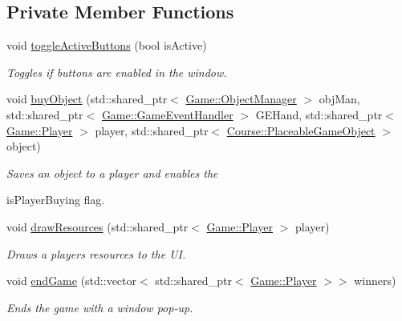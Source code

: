 \subsection*{Private Member Functions}
\begin{DoxyCompactItemize}
\item 
void \hyperlink{classMapWindow_af6b808b08a8a0b4a40ba2219550090da}{toggle\-Active\-Buttons} (bool is\-Active)
\begin{DoxyCompactList}\small\item\em Toggles if buttons are enabled in the window. \end{DoxyCompactList}\item 
void \hyperlink{classMapWindow_a4d3e6079aa5f3c271e8e2fb2784be78c}{buy\-Object} (std\-::shared\-\_\-ptr$<$ \hyperlink{classGame_1_1ObjectManager}{Game\-::\-Object\-Manager} $>$ obj\-Man, std\-::shared\-\_\-ptr$<$ \hyperlink{classGame_1_1GameEventHandler}{Game\-::\-Game\-Event\-Handler} $>$ G\-E\-Hand, std\-::shared\-\_\-ptr$<$ \hyperlink{classGame_1_1Player}{Game\-::\-Player} $>$ player, std\-::shared\-\_\-ptr$<$ \hyperlink{classCourse_1_1PlaceableGameObject}{Course\-::\-Placeable\-Game\-Object} $>$ object)
\begin{DoxyCompactList}\small\item\em Saves an object to a player and enables the \par
is\-Player\-Buying flag. \end{DoxyCompactList}\item 
void \hyperlink{classMapWindow_ae278b986bf74a6d2bfb83df5433b3622}{draw\-Resources} (std\-::shared\-\_\-ptr$<$ \hyperlink{classGame_1_1Player}{Game\-::\-Player} $>$ player)
\begin{DoxyCompactList}\small\item\em Draws a players resources to the U\-I. \end{DoxyCompactList}\item 
void \hyperlink{classMapWindow_acb9a6e18ec63ab1d00fac7a40353f04d}{end\-Game} (std\-::vector$<$ std\-::shared\-\_\-ptr$<$ \hyperlink{classGame_1_1Player}{Game\-::\-Player} $>$$>$ winners)
\begin{DoxyCompactList}\small\item\em Ends the game with a window pop-\/up. \end{DoxyCompactList}\end{DoxyCompactItemize}
